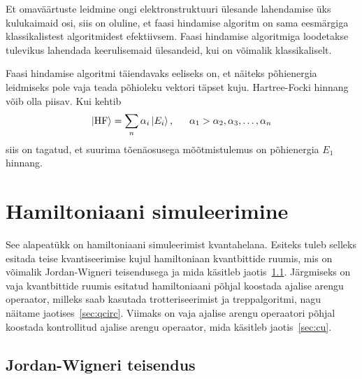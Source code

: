 \documentclass[12pt]{report}
\def\ket#1{\left|#1\right>}
\begin{document}
Et omaväärtuste leidmine ongi elektronstruktuuri ülesande lahendamise üks kulukaimaid osi, siis on oluline, et faasi hindamise algoritm on sama eesmärgiga klassikalistest algoritmidest efektiivsem.
Faasi hindamise algoritmiga loodetakse tulevikus lahendada keerulisemaid ülesandeid, kui on võimalik klassikaliselt.

Faasi hindamise algoritmi täiendavaks eeliseks on, et näiteks põhienergia leidmiseks pole vaja teada põhioleku vektori täpset kuju.
Hartree-Focki hinnang võib olla piisav.
Kui kehtib
\begin{align}
    \ket{\text{HF}} = \sum_n \alpha_i \ket{E_i} \rlap{,}
    \qquad \alpha_1 > \alpha_2, \alpha_3, \ldots, \alpha_n
\end{align}
siis on tagatud, et suurima tõenäosusega mõõtmistulemus on põhienergia \(E_1\) hinnang.

\section{Hamiltoniaani simuleerimine}\label{sec:hamsim}

See alapeatükk on hamiltoniaani simuleerimist kvantahelana.
Esiteks tuleb selleks esitada teise kvantiseerimise kujul hamiltoniaan kvantbittide ruumis, mis on võimalik Jordan-Wigneri teisendusega ja mida käsitleb jaotis~\ref{sec:jw}.
Järgmiseks on vaja kvantbittide ruumis esitatud hamiltoniaani põhjal koostada ajalise arengu operaator, milleks saab kasutada trotteriseerimist ja treppalgoritmi, nagu näitame jaotises~\ref{sec:qcirc}.
Viimaks on vaja ajalise arengu operaatori põhjal koostada kontrollitud ajalise arengu operaator, mida käsitleb jaotis~\ref{sec:cu}.

\subsection{Jordan-Wigneri teisendus}\label{sec:jw}
\end{document}
